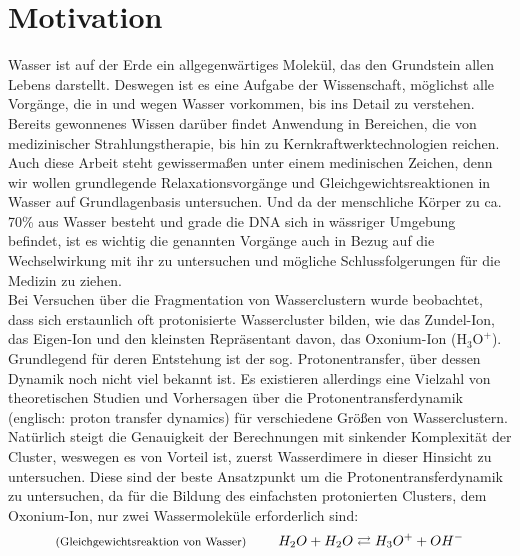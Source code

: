 
  \chapter{Motivation} 
  
  Wasser ist auf der Erde ein allgegenwärtiges Molekül, das den Grundstein allen Lebens darstellt. Deswegen ist es eine Aufgabe der Wissenschaft, möglichst alle Vorgänge, die in und wegen Wasser vorkommen, bis ins Detail zu verstehen. Bereits gewonnenes Wissen darüber findet Anwendung in Bereichen, die von medizinischer Strahlungstherapie, bis hin zu Kernkraftwerktechnologien reichen. 
  Auch diese Arbeit steht gewissermaßen unter einem medinischen Zeichen, denn wir wollen grundlegende Relaxationsvorgänge und Gleichgewichtsreaktionen in Wasser auf Grundlagenbasis untersuchen. Und da der menschliche Körper zu ca. 70\% aus Wasser besteht und grade die DNA sich in wässriger Umgebung befindet, ist es wichtig die genannten Vorgänge auch in Bezug auf die Wechselwirkung mit ihr zu untersuchen und mögliche Schlussfolgerungen für die Medizin zu ziehen.\\
  Bei Versuchen über die Fragmentation von Wasserclustern wurde beobachtet, dass sich erstaunlich oft protonisierte Wassercluster bilden, wie das Zundel-Ion, das Eigen-Ion und den kleinsten Repräsentant davon, das Oxonium-Ion ($\mathrm{H_3O^+}$). Grundlegend für deren Entstehung ist der sog. Protonentransfer, über dessen Dynamik noch nicht viel bekannt ist. Es existieren allerdings eine Vielzahl von theoretischen Studien und Vorhersagen über die Protonentransferdynamik (englisch: proton transfer dynamics) für verschiedene Größen von Wasserclustern. Natürlich steigt die Genauigkeit der Berechnungen mit sinkender Komplexität der Cluster, weswegen es von Vorteil ist, zuerst Wasserdimere in dieser Hinsicht zu untersuchen. Diese sind der beste Ansatzpunkt um die Protonentransferdynamik zu untersuchen, da für die Bildung des einfachsten protonierten Clusters, dem Oxonium-Ion, nur zwei Wassermoleküle erforderlich sind:
  \begin{equation}
  \textmd{{\footnotesize(Gleichgewichtsreaktion von Wasser) }}\qquad H_2O + H_2O \rightleftarrows H_3O^+ + OH^- 
  \end{equation} 
  
